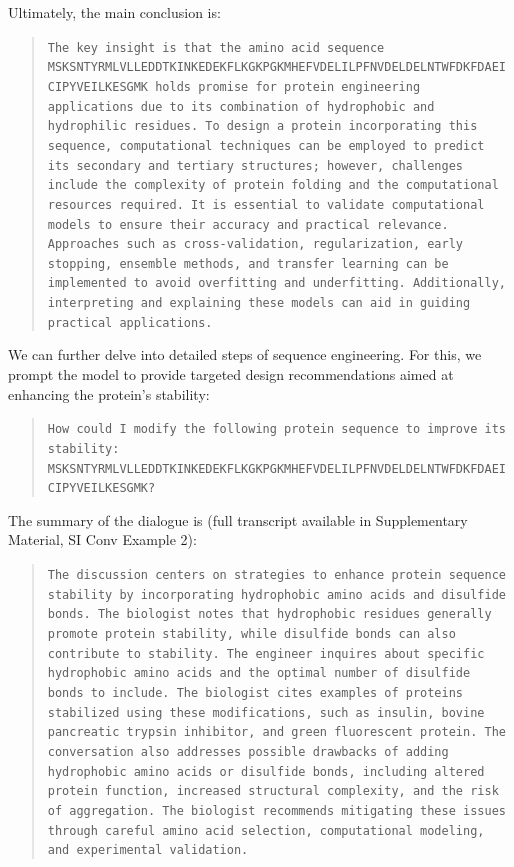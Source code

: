 Ultimately, the main conclusion is:

\begin{quote}
\small\texttt{The key insight is that the amino acid sequence MSKSNTYRMLVLLEDDTKINKEDEKFLKGKPGKMHEFVDELILPFNVDELDELNTWFDKFDAEICIPYVEILKESGMK holds promise for protein engineering applications due to its combination of hydrophobic and hydrophilic residues. To design a protein incorporating this sequence, computational techniques can be employed to predict its secondary and tertiary structures; however, challenges include the complexity of protein folding and the computational resources required. It is essential to validate computational models to ensure their accuracy and practical relevance. Approaches such as cross-validation, regularization, early stopping, ensemble methods, and transfer learning can be implemented to avoid overfitting and underfitting. Additionally, interpreting and explaining these models can aid in guiding practical applications.}
\end{quote}

We can further delve into detailed steps of sequence engineering. For this, we prompt the model to provide targeted design recommendations aimed at enhancing the protein's stability:

\begin{quote}
\small\texttt{How could I modify the following protein sequence to improve its stability: MSKSNTYRMLVLLEDDTKINKEDEKFLKGKPGKMHEFVDELILPFNVDELDELNTWFDKFDAEICIPYVEILKESGMK? }
\end{quote}

The summary of the dialogue is (full transcript available in Supplementary Material, SI Conv Example 2):

\begin{quote}
\small\texttt{The discussion centers on strategies to enhance protein sequence stability by incorporating hydrophobic amino acids and disulfide bonds. The biologist notes that hydrophobic residues generally promote protein stability, while disulfide bonds can also contribute to stability. The engineer inquires about specific hydrophobic amino acids and the optimal number of disulfide bonds to include. The biologist cites examples of proteins stabilized using these modifications, such as insulin, bovine pancreatic trypsin inhibitor, and green fluorescent protein. The conversation also addresses possible drawbacks of adding hydrophobic amino acids or disulfide bonds, including altered protein function, increased structural complexity, and the risk of aggregation. The biologist recommends mitigating these issues through careful amino acid selection, computational modeling, and experimental validation.}
\end{quote}

